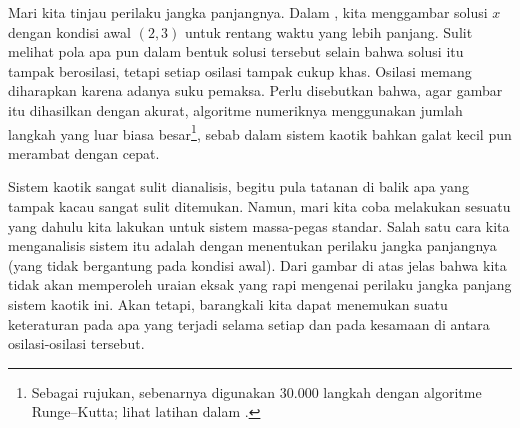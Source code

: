 \begin{myfig}
\capstart
{}
\caption{Solusi persamaan Duffing yang diberikan untuk $t$ dari 0 hingga 100.
\label{nlin:duf-long}}
\end{myfig}

\pagebreak[2]
Mari kita tinjau perilaku jangka panjangnya.
Dalam , kita menggambar solusi $x$ dengan kondisi awal
$(2,3)$ untuk rentang waktu yang lebih panjang.  Sulit melihat pola apa pun
dalam bentuk solusi tersebut selain bahwa solusi itu tampak berosilasi, tetapi
setiap osilasi tampak cukup khas.  Osilasi memang diharapkan karena adanya
suku pemaksa.  Perlu disebutkan bahwa, agar gambar itu dihasilkan dengan
akurat, algoritme numeriknya menggunakan jumlah langkah yang luar biasa
besar\footnote{Sebagai rujukan, sebenarnya digunakan 30.000 langkah dengan
algoritme Runge--Kutta; lihat latihan dalam .},
sebab dalam sistem kaotik bahkan galat kecil pun merambat dengan cepat.


Sistem kaotik sangat sulit dianalisis, begitu pula tatanan di balik apa yang
tampak kacau sangat sulit ditemukan.  Namun, mari kita coba melakukan sesuatu
yang dahulu kita lakukan untuk sistem massa-pegas standar.  Salah satu cara
kita menganalisis sistem itu adalah dengan menentukan perilaku jangka
panjangnya (yang tidak bergantung pada kondisi awal).  Dari gambar di atas jelas
bahwa kita tidak akan memperoleh uraian eksak yang rapi mengenai perilaku
jangka panjang sistem kaotik ini.  Akan tetapi, barangkali kita dapat menemukan
suatu keteraturan pada apa yang terjadi selama setiap  dan
pada kesamaan di antara osilasi-osilasi tersebut.

